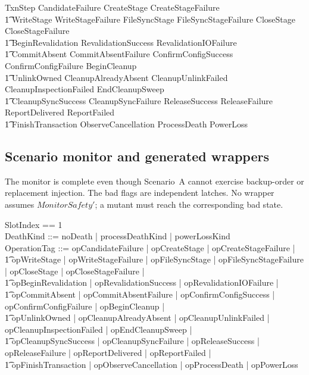 \documentclass{article}
\begin{document}
\begin{zed}
	TxnStep  CandidateFailure \lor CreateStage \lor CreateStageFailure \lor \\
	\t1 WriteStage \lor WriteStageFailure \lor FileSyncStage \lor
	FileSyncStageFailure \lor CloseStage \lor CloseStageFailure \lor \\
	\t1 BeginRevalidation \lor RevalidationSuccess \lor RevalidationIOFailure \lor \\
	\t1 CommitAbsent \lor CommitAbsentFailure \lor ConfirmConfigSuccess \lor
	ConfirmConfigFailure \lor BeginCleanup \lor \\
	\t1 UnlinkOwned \lor CleanupAlreadyAbsent \lor CleanupUnlinkFailed \lor
	CleanupInspectionFailed \lor EndCleanupSweep \lor \\
	\t1 CleanupSyncSuccess \lor CleanupSyncFailure \lor ReleaseSuccess \lor
	ReleaseFailure \lor ReportDelivered \lor ReportFailed \lor \\
	\t1 FinishTransaction \lor ObserveCancellation \lor ProcessDeath \lor PowerLoss
\end{zed}

\subsection{Scenario monitor and generated wrappers}

The monitor is complete even though Scenario~A cannot exercise backup-order or
replacement injection.  The bad flags are independent latches.  No wrapper
assumes $MonitorSafety'$; a mutant must reach the corresponding bad state.

\begin{zed}
	SlotIndex == 1  \\
	DeathKind ::= noDeath | processDeathKind | powerLossKind \\
	OperationTag ::= opCandidateFailure | opCreateStage | opCreateStageFailure | \\
	\t1 opWriteStage | opWriteStageFailure | opFileSyncStage |
	opFileSyncStageFailure | opCloseStage | opCloseStageFailure | \\
	\t1 opBeginRevalidation | opRevalidationSuccess | opRevalidationIOFailure | \\
	\t1 opCommitAbsent | opCommitAbsentFailure | opConfirmConfigSuccess |
	opConfirmConfigFailure | opBeginCleanup | \\
	\t1 opUnlinkOwned | opCleanupAlreadyAbsent | opCleanupUnlinkFailed |
	opCleanupInspectionFailed | opEndCleanupSweep | \\
	\t1 opCleanupSyncSuccess | opCleanupSyncFailure | opReleaseSuccess |
	opReleaseFailure | opReportDelivered | opReportFailed | \\
	\t1 opFinishTransaction | opObserveCancellation | opProcessDeath | opPowerLoss
\end{zed}
\end{document}
